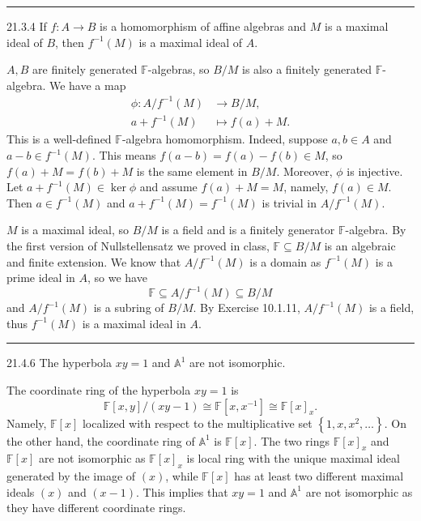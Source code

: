 \documentclass[letterpaper, 12pt]{article}
\begin{document}
\noindent\rule{7in}{2.8pt}
\begin{problem}{21.3.4}
If \(f:A\rightarrow B\) is a homomorphism of affine algebras and \(M\) is a maximal ideal of \(B\), then \(f^{-1}(M)\) is a maximal ideal of \(A\).
\end{problem}
\begin{solution}
\(A,B\) are finitely generated \(\mathbb{F}\)-algebras, so \(B/M\) is also a finitely generated \(\mathbb{F}\)-algebra. We have a map 
\begin{align*}
    \phi: A/f^{-1}(M)&\rightarrow B/M,\\ 
          a+f^{-1}(M)&\mapsto f(a)+M.
\end{align*}
This is a well-defined \(\mathbb{F}\)-algebra homomorphism. Indeed, suppose \(a,b\in A\) and \(a-b\in f^{-1}(M)\). This means \(f(a-b)=f(a)-f(b)\in M\), so \(f(a)+M=f(b)+M\) is the same element in \(B/M\). Moreover, \(\phi\) is injective. Let \(a+f^{-1}(M)\in \ker \phi\) and assume \(f(a)+M=M\), namely, \(f(a)\in M\). Then \(a\in f^{-1}(M)\) and \(a+f^{-1}(M)=f^{-1}(M)\) is trivial in \(A/f^{-1}(M)\). 

\(M\) is a maximal ideal, so \(B/M\) is a field and is a finitely generator \(\mathbb{F}\)-algebra. By the first version of Nullstellensatz we proved in class, \(\mathbb{F}\subseteq B/M\) is an algebraic and finite extension. We know that \(A/f^{-1}(M)\) is a domain as \(f^{-1}(M)\) is a prime ideal in \(A\), so we have 
\[\mathbb{F}\subseteq A/f^{-1}(M)\subseteq B/M\]
and \(A/f^{-1}(M)\) is a subring of \(B/M\). By Exercise 10.1.11, \(A/f^{-1}(M)\) is a field, thus \(f^{-1}(M)\) is a maximal ideal in \(A\). 
\end{solution}

\noindent\rule{7in}{2.8pt}
\begin{problem}{21.4.6}
The hyperbola \(xy=1\) and \(\mathbb{A}^1\) are not isomorphic.
\end{problem}
\begin{solution}
The coordinate ring of the hyperbola \(xy=1\) is 
\[\mathbb{F}[x,y]/(xy-1)\cong \mathbb{F}[x,x^{-1}]\cong \mathbb{F}[x]_x.\]
Namely, \(\mathbb{F}[x]\) localized with respect to the multiplicative set \(\left\{ 1,x,x^2,\ldots \right\}\). On the other hand, the coordinate ring of \(\mathbb{A}^1\) is \(\mathbb{F}[x]\). The two rings \(\mathbb{F}[x]_x\) and \(\mathbb{F}[x]\) are not isomorphic as \(\mathbb{F}[x]_x\) is local ring with the unique maximal ideal generated by the image of \((x)\), while \(\mathbb{F}[x]\) has at least two different maximal ideals \((x)\) and \((x-1)\). This implies that \(xy=1\) and \(\mathbb{A}^1\) are not isomorphic as they have different coordinate rings.
\end{solution}
\end{document}
